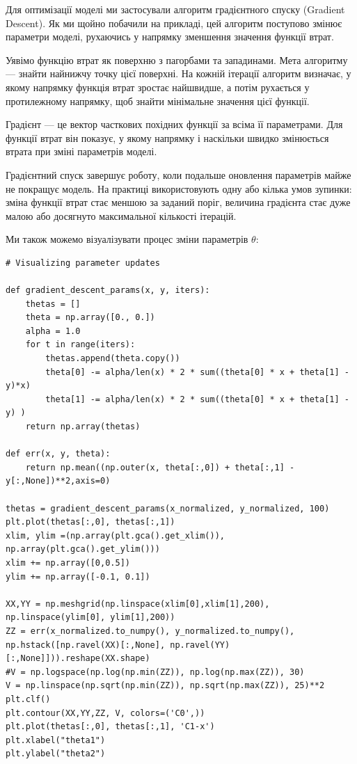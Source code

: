 Для оптимізації моделі ми застосували алгоритм градієнтного спуску (Gradient Descent). Як ми щойно побачили на прикладі, цей алгоритм поступово змінює параметри моделі, рухаючись у напрямку зменшення значення функції втрат.

Уявімо функцію втрат як поверхню з пагорбами та западинами. Мета алгоритму — знайти найнижчу точку цієї поверхні. На кожній ітерації алгоритм визначає, у якому напрямку функція втрат зростає найшвидше, а потім рухається у протилежному напрямку, щоб знайти мінімальне значення цієї функції.

Градієнт — це вектор часткових похідних функції за всіма її параметрами. Для функції втрат він показує, у якому напрямку і наскільки швидко змінюється втрата при зміні параметрів моделі.

Градієнтний спуск завершує роботу, коли подальше оновлення параметрів майже не покращує модель. На практиці використовують одну або кілька умов зупинки: зміна функції втрат стає меншою за заданий поріг, величина градієнта стає дуже малою або досягнуто максимальної кількості ітерацій.

Ми також можемо візуалізувати процес зміни параметрів $\theta$:

\begin{lstlisting}
# Visualizing parameter updates

def gradient_descent_params(x, y, iters):
    thetas = []
    theta = np.array([0., 0.])
    alpha = 1.0
    for t in range(iters):
        thetas.append(theta.copy())
        theta[0] -= alpha/len(x) * 2 * sum((theta[0] * x + theta[1] - y)*x)
        theta[1] -= alpha/len(x) * 2 * sum((theta[0] * x + theta[1] - y) )
    return np.array(thetas)

def err(x, y, theta):
    return np.mean((np.outer(x, theta[:,0]) + theta[:,1] - y[:,None])**2,axis=0)

thetas = gradient_descent_params(x_normalized, y_normalized, 100)
plt.plot(thetas[:,0], thetas[:,1])
xlim, ylim =(np.array(plt.gca().get_xlim()), np.array(plt.gca().get_ylim()))
xlim += np.array([0,0.5])
ylim += np.array([-0.1, 0.1])

XX,YY = np.meshgrid(np.linspace(xlim[0],xlim[1],200), np.linspace(ylim[0], ylim[1],200))
ZZ = err(x_normalized.to_numpy(), y_normalized.to_numpy(), np.hstack([np.ravel(XX)[:,None], np.ravel(YY)[:,None]])).reshape(XX.shape)
#V = np.logspace(np.log(np.min(ZZ)), np.log(np.max(ZZ)), 30)
V = np.linspace(np.sqrt(np.min(ZZ)), np.sqrt(np.max(ZZ)), 25)**2
plt.clf()
plt.contour(XX,YY,ZZ, V, colors=('C0',))
plt.plot(thetas[:,0], thetas[:,1], 'C1-x')
plt.xlabel("theta1")
plt.ylabel("theta2")
\end{lstlisting}


